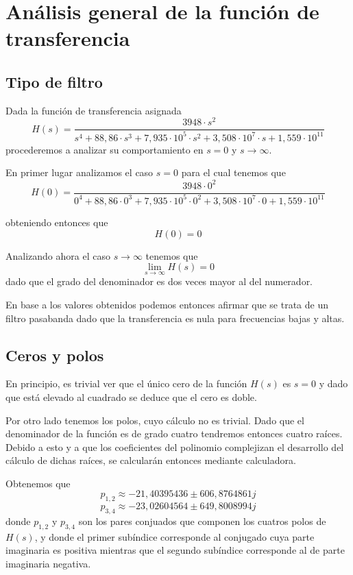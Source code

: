 \documentclass[11pt,a4paper]{report}
\author{Marcos Rolando}
\begin{document}

\section*{Análisis general de la función de transferencia}

\subsection*{Tipo de filtro}

Dada la función de transferencia asignada
\[H(s)=\frac{3948 \cdot s^2}{s^4+88,86 \cdot s^3+7,935 \cdot 10^5 \cdot s^2+3,508 \cdot 10^7 \cdot s+1,559 \cdot 10^{11}}\]
procederemos a analizar su comportamiento en $s=0$ y $s\longrightarrow\infty$.

\bigskip
En primer lugar analizamos el caso $s=0$ para el cual tenemos que 
\[H(0) = \frac{3948 \cdot 0^2}{0^4+88,86 \cdot 0^3+7,935 \cdot 10^5 \cdot 0^2+3,508 \cdot 10^7 \cdot 0+1,559 \cdot 10^{11}}\]

obteniendo entonces que
\[H(0) = 0\]

Analizando ahora el caso $s\longrightarrow\infty$ tenemos que
\[\lim_{s \to \infty} H(s) = 0\]
dado que el grado del denominador es dos veces mayor al del numerador.

\bigskip
En base a los valores obtenidos podemos entonces afirmar que se trata de un
filtro pasabanda dado que la transferencia es nula para frecuencias bajas y altas.

\subsection*{Ceros y polos}

En principio, es trivial ver que el único cero de la función $H(s)$ es
$s = 0$ y dado que está elevado al cuadrado se deduce que el cero es doble.

\bigskip
Por otro lado tenemos los polos, cuyo cálculo no es trivial. Dado que el denominador de la función es de grado cuatro tendremos entonces cuatro raíces. Debido a esto
y a que los coeficientes del polinomio complejizan el desarrollo del cálculo de 
dichas raíces, se calcularán entonces mediante calculadora. 

\bigskip
Obtenemos que
\[p_{1,2} \approx -21,40395436 \pm 606,8764861j\]
\[p_{3,4} \approx -23,02604564 \pm 649,8008994j\]
donde $p_{1,2}$ y $p_{3,4}$ son los pares conjuados que componen los cuatros
polos de $H(s)$, y donde el primer subíndice corresponde al conjugado cuya parte imaginaria es positiva mientras que el segundo subíndice corresponde al de parte imaginaria negativa.
\end{document}
